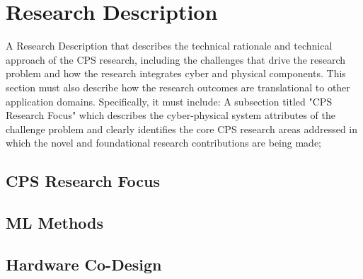 \section{Research Description}\label{sec.researchplan}

A Research Description that describes the technical rationale and technical approach of the CPS research, including the challenges that drive the research problem and how the research integrates cyber and physical components. This section must also describe how the research outcomes are translational to other application domains. Specifically, it must include:
A subsection titled "CPS Research Focus" which describes the cyber-physical system attributes of the challenge problem and clearly identifies the core CPS research areas addressed in which the novel and foundational research contributions are being made;

\subsection{CPS Research Focus}\label{sec:problems}



\subsection{ML Methods}\label{sec:ML}


\subsection{Hardware Co-Design}\label{sec:hardware}



 